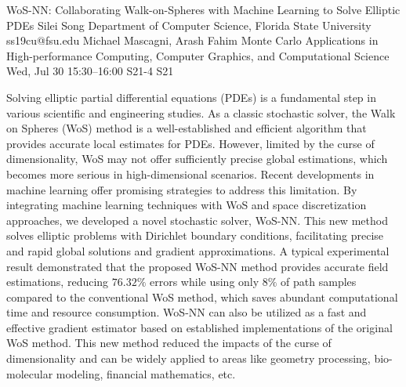 \begin{talk}
  {WoS-NN: Collaborating Walk-on-Spheres with Machine Learning to Solve Elliptic PDEs}%
  {Silei Song}%
  {Department of Computer Science, Florida State University}%
  {ss19cu@fsu.edu}%
  {Michael Mascagni, Arash Fahim}%
  {Monte Carlo Applications in High-performance Computing, Computer Graphics, and Computational Science}%
  {Wed, Jul 30 15:30--16:00}%
  {S21-4}%
  {S21}%
    
   
Solving elliptic partial differential equations (PDEs) is a fundamental step in various scientific and engineering studies. As a classic stochastic solver, the Walk on Spheres (WoS) method is a well-established and efficient algorithm that provides accurate local estimates for PDEs. However, limited by the curse of dimensionality, WoS may not offer sufficiently precise global estimations, which becomes more serious in high-dimensional scenarios. Recent developments in machine learning offer promising strategies to address this limitation. By integrating machine learning techniques with WoS and space discretization approaches, we developed a novel stochastic solver, WoS-NN. This new method solves elliptic problems with Dirichlet boundary conditions, facilitating precise and rapid global solutions and gradient approximations. A typical experimental result demonstrated that the proposed WoS-NN method provides accurate field estimations, reducing $76.32\%$ errors while using only $8\%$ of path samples compared to the conventional WoS method, which saves abundant computational time and resource consumption. WoS-NN can also be utilized as a fast and effective gradient estimator based on established implementations of the original WoS method. This new method reduced the impacts of the curse of dimensionality and can be widely applied to areas like geometry processing, bio-molecular modeling, financial mathematics, etc.

\medskip

\end{talk}

